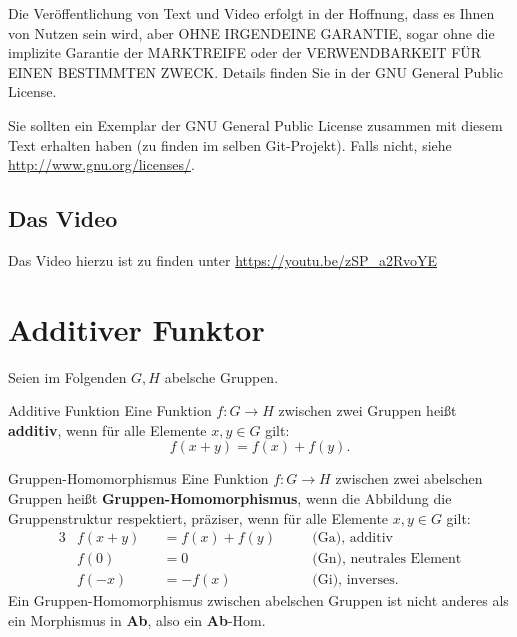 \documentclass[a4paper]{amsart}
\theoremstyle{definition}
\begin{document}
Die Veröffentlichung von Text und Video erfolgt in der Hoffnung, dass es Ihnen von Nutzen sein wird, 
aber OHNE IRGENDEINE GARANTIE, sogar ohne die implizite Garantie der MARKTREIFE oder der 
VERWENDBARKEIT FÜR EINEN BESTIMMTEN ZWECK. Details finden Sie in der GNU General Public License.

Sie sollten ein Exemplar der GNU General Public License zusammen mit diesem Text erhalten haben 
(zu finden im selben Git-Projekt). 
Falls nicht, siehe \url{http://www.gnu.org/licenses/}.

\subsection*{Das Video}
Das Video hierzu ist zu finden unter 
{\tiny
   \url{https://youtu.be/zSP_a2RvoYE}
}

\section{Additiver Funktor}
Seien im Folgenden $G, H$ abelsche Gruppen.
\begin{Definition}{Additive Funktion}
   Eine Funktion $f \colon G \to H$ zwischen zwei Gruppen heißt \textbf{additiv}, wenn für alle Elemente $x,y \in G$ gilt:
   \begin{equation}
      f(x+y) = f(x) + f(y).
   \end{equation}
\end{Definition} 

\begin{Definition}{Gruppen-Homomorphismus}
   Eine Funktion $f \colon G \to H$ zwischen zwei abelschen Gruppen heißt \textbf{Gruppen-Homomorphismus}, wenn die Abbildung die Gruppenstruktur respektiert, präziser, wenn für alle Elemente $x,y \in G$ gilt:
   \begin{alignat}{3}
      &f(x+y) &&= f(x) + f(y) && \quad \text{(Ga), additiv}\\
      &f(0)   &&= 0           && \quad \text{(Gn), neutrales Element}\\
      &f(-x)  &&= -f(x)       && \quad \text{(Gi), inverses}.
   \end{alignat}
   Ein Gruppen-Homomorphismus zwischen abelschen Gruppen ist nicht anderes als ein Morphismus in \textbf{Ab}, also ein \textbf{Ab}-Hom.
\end{Definition} 
\end{document}
